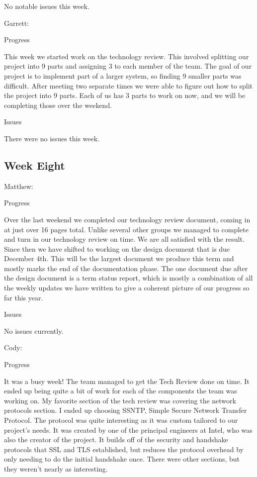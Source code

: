 \documentclass[10pt,onecolumn,journal,draftclsnofoot]{IEEEtran}
\begin{document}
No notable issues this week.

Garrett:

Progress

This week we started work on the technology review. This involved splitting our
project into 9 parts and assigning 3 to each member of the team. The goal of our
project is to implement part of a larger system, so finding 9 smaller parts was
difficult. After meeting two separate times we were able to figure out how to
split the project into 9 parts. Each of us has 3 parts to work on now, and we
will be completing those over the weekend.

Issues

There were no issues this week.

\subsection{Week Eight}

Matthew:

Progress

Over the last weekend we completed our technology review document, coming in at
just over 16 pages total. Unlike several other groups we managed to complete and
turn in our technology review on time. We are all satisfied with the result.
Since then we have shifted to working on the design document that is due
December 4th. This will be the largest document we produce this term and mostly
marks the end of the documentation phase. The one document due after the design
document is a term status report, which is mostly a combination of all the
weekly updates we have written to give a coherent picture of our progress so far
this year.

Issues

No issues currently.

Cody:

Progress

It was a busy week! The team managed to get the Tech Review done on time. It
ended up being quite a bit of work for each of the components the team was
working on. My favorite section of the tech review was covering the network
protocols section. I ended up choosing SSNTP, Simple Secure Network Transfer
Protocol. The protocol was quite interesting as it was custom tailored to our
project's needs. It was created by one of the principal engineers at Intel, who
was also the creator of the project. It builds off of the security and handshake
protocols that SSL and TLS established, but reduces the protocol overhead by
only needing to do the initial handshake once. There were other sections, but
they weren't nearly as interesting.
\end{document}
